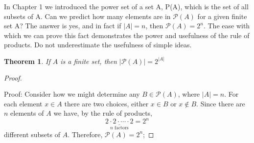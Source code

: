 \documentclass[10pt,]{book}
\theoremstyle{plain}
\newtheorem{theorem}{Theorem}[section]
\theoremstyle{definition}
\begin{document}
 In Chapter 1 we introduced the power set of a set A, P(A), which is the set of all subsets of A. Can we predict how many elements are in \(\mathcal{P}(A)\) for a given finite set A? The answer is yes, and in fact if \(\lvert A \rvert  = n\), then \(\mathcal{P}(A) = 2^{n}\).  The ease with which we can prove this fact demonstrates the power and usefulness of the rule of products. Do not underestimate the usefulness of simple ideas.
%
\begin{theorem}\label{power-set-cardinality-theorem}
If \(A\) is a finite set, then \(\lvert \mathcal{P}(A) \rvert = 2^{\lvert A \rvert }\)\end{theorem}
\begin{proof}\hypertarget{proof-1}{}

Proof: Consider how we might determine any \(B \in \mathcal{P}(A)\), where \( \lvert A \rvert =n\). For each element \(x \in A\) there are two choices, either \(x \in B\) or \(x \notin B\).  Since there are \(n\)  elements of \(A\)  we have, by the rule of products, 
  \[\underset{n \textrm{ factors}}{\underline{2 \cdot 2 \cdot  \cdots \cdot 2}}=  2^n\]   different subsets of \(A\). Therefore, \(\mathcal{P}(A)= 2^{n}\);
\end{proof}
\typeout{************************************************}
\typeout{************************************************}
\end{document}

